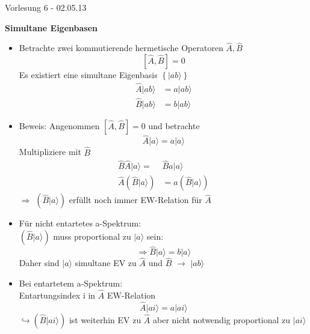 \documentclass[10pt,article,colorback,accentcolor=tud9d]{scrartcl}
\begin{document}
\begin{flushright}
Vorlesung 6 - 02.05.13
\end{flushright}
\textbf{Simultane Eigenbasen}
  \begin{itemize}
    \item Betrachte zwei kommutierende hermetische Operatoren $\hat{A},\hat{B}$
      \begin{equation}
        \left[\hat{A},\hat{B}\right]=0
      \end{equation}
      Es existiert eine simultane Eigenbasis $\left\{|ab\rangle\right\}$
      \begin{equation}
      \begin{aligned}
      \hat{A}|ab\rangle&=a|ab\rangle\\
      \hat{B}|ab\rangle&=b|ab\rangle
      \end{aligned}
      \end{equation}
    \item Beweis: Angenommen $\left[\hat{A},\hat{B}\right]=0$ und betrachte 
      \begin{equation}
      \hat{A}|a\rangle=a|a\rangle
      \end{equation}
      Multipliziere mit $\hat{B}$
      \begin{equation}
      \begin{aligned}
      \hat{B}\hat{A}|a\rangle=&\hat{B}a|a\rangle\\
      \hat{A}\left(\hat{B}|a\rangle\right)&=a\left(\hat{B}|a\rangle\right)
      \end{aligned}
      \end{equation}
        $\Rightarrow$ $\left(\hat{B}|a\rangle\right)$ erfüllt noch immer EW-Relation für $\hat{A}$
    \item Für nicht entartetes a-Spektrum:\\
      $\left(\hat{B}|a\rangle\right)$ muss proportional zu $|a\rangle$ sein:
      \begin{equation}
      \Rightarrow \hat{B}|a\rangle=b|a\rangle
      \end{equation}
      Daher sind $|a\rangle$ simultane EV zu $\hat{A}$ und $\hat{B}$ $\rightarrow$ $|ab\rangle$
    \item Bei entartetem a-Spektrum:\\
      Entartungsindex i in $\hat{A}$ EW-Relation
      \begin{equation}
      \hat{A}|ai\rangle =a|ai\rangle
      \end{equation}
      $\hookrightarrow \left(\hat{B}|ai\rangle\right)$ ist weiterhin EV zu $\hat{A}$ aber nicht notwendig proportional zu $|ai\rangle$\\

\end{itemize}
\end{document}
